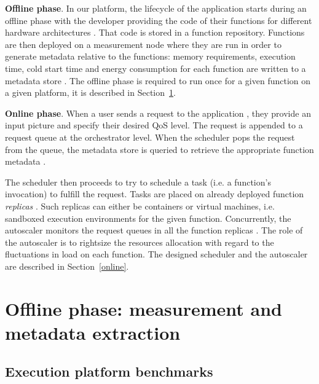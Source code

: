 \textbf{Offline phase}. In our platform, the lifecycle of the application starts during an offline phase with the developer providing the code of their functions for different hardware architectures . That code is stored in a function repository. Functions are then deployed on a measurement node  where they are run in order to generate metadata relative to the functions: memory requirements, execution time, cold start time and energy consumption for each function are written to a metadata store . The offline phase is required to run once for a given function on a given platform, it is described in Section~\ref{offline}.

\textbf{Online phase}. When a user sends a request to the application , they provide an input picture and specify their desired QoS level. The request is appended to a request queue  at the orchestrator level. When the scheduler pops the request from the queue, the metadata store is queried to retrieve the appropriate function metadata .

The scheduler then proceeds to try to schedule a task (i.e. a function's invocation) to fulfill the request. Tasks are placed on already deployed function \textit{replicas} . Such replicas can either be containers or virtual machines, i.e. sandboxed execution environments for the given function. 
Concurrently, the autoscaler monitors the request queues in all the function replicas . The role of the autoscaler is to rightsize the resources allocation with regard to the fluctuations in load on each function. 
The designed scheduler and the autoscaler are described in Section~\ref{online}.

\section{Offline phase: measurement and metadata extraction}
\label{offline}
\subsection{Execution platform benchmarks}

